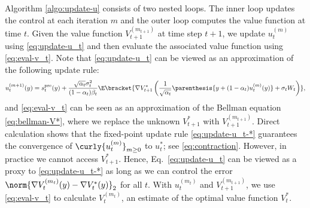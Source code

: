 \documentclass{article}
\begin{document}
{Algorithm \ref{algo:update-u} consists of two nested loops. The inner loop updates the control at each iteration $m$ and the outer loop computes the value function at time $t$.} Given the value function $V_{t+1}^{(m_{t+1})}$ at time step $t+1$, we update $u_t^{(m)}$ using \eqref{eq:update-u_t} and then evaluate the associated value function using \eqref{eq:eval-v_t}. Note that \eqref{eq:update-u_t} can be viewed as an approximation of the following update rule:
\begin{align}
        u_{t}^{(m+1)}(y) = s_{t}^{\rm pre}(y) + \frac{\sqrt{\alpha_{t}}\sigma_{t}^{2}}{(1 - \alpha_{t})\beta_t}\E\bracket{\nabla {V}_{t+1}^{*}\left(\frac{1}{\sqrt{\alpha_t}}\parenthesis{y + (1 - \alpha_t)u_t^{(m)}(y)} + \sigma_t W_t\right)}, \label{eq:update-u_t-*}
\end{align}
and \eqref{eq:eval-v_t} can be seen as an approximation of the Bellman equation \eqref{eq:bellman-V*}, where we replace the unknown $V_{t+1}^*$ with $V_{t+1}^{(m_{t+1})}$.
Direct calculation shows that the fixed-point update rule \eqref{eq:update-u_t-*} guarantees the convergence of $\curly{u_t^{(m)}}_{m\geq 0}$ to $u_t^*$; see \eqref{eq:contraction}. However, in practice we cannot access $V_{t+1}^*$. Hence, Eq.~\eqref{eq:update-u_t} can be viewed as a proxy to \eqref{eq:update-u_t-*} as long as we can control the error $\norm{\nabla V_t^{(m_t)}(y) - \nabla V_t^*(y)}_2$ for all $t$. With $u_t^{(m_t)}$ and $V_{t+1}^{(m_{t+1})}$, we use \eqref{eq:eval-v_t} to  calculate $V_{t}^{(m_t)}$, an estimate of the optimal value function $V_t^*$. 
\end{document}
